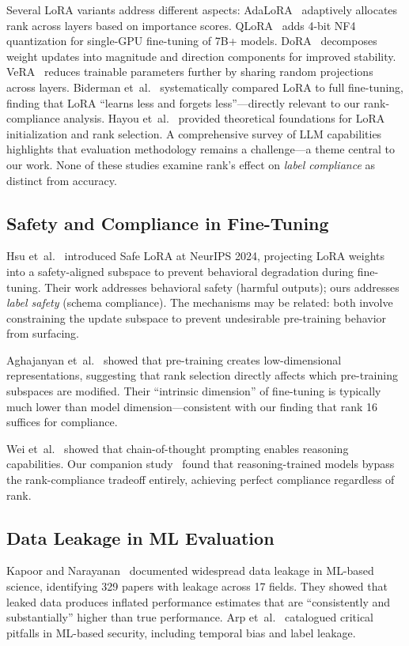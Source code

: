 \documentclass[journal]{IEEEtran}
\begin{document}
Several LoRA variants address different aspects: AdaLoRA~\cite{zhang2023} adaptively allocates rank across layers based on importance scores. QLoRA~\cite{dettmers2023} adds 4-bit NF4 quantization for single-GPU fine-tuning of 7B+ models. DoRA~\cite{liu2024} decomposes weight updates into magnitude and direction components for improved stability. VeRA~\cite{kopiczko2024} reduces trainable parameters further by sharing random projections across layers. Biderman et~al.~\cite{biderman2024} systematically compared LoRA to full fine-tuning, finding that LoRA ``learns less and forgets less''---directly relevant to our rank-compliance analysis. Hayou et~al.~\cite{hayou2024} provided theoretical foundations for LoRA initialization and rank selection. A comprehensive survey of LLM capabilities~\cite{zhao2023} highlights that evaluation methodology remains a challenge---a theme central to our work. None of these studies examine rank's effect on \emph{label compliance} as distinct from accuracy.

\subsection{Safety and Compliance in Fine-Tuning}
Hsu et~al.~\cite{safelora2024} introduced Safe LoRA at NeurIPS 2024, projecting LoRA weights into a safety-aligned subspace to prevent behavioral degradation during fine-tuning. Their work addresses behavioral safety (harmful outputs); ours addresses \emph{label safety} (schema compliance). The mechanisms may be related: both involve constraining the update subspace to prevent undesirable pre-training behavior from surfacing.

Aghajanyan et~al.~\cite{aghajanyan2021} showed that pre-training creates low-dimensional representations, suggesting that rank selection directly affects which pre-training subspaces are modified. Their ``intrinsic dimension'' of fine-tuning is typically much lower than model dimension---consistent with our finding that rank 16 suffices for compliance.

Wei et~al.~\cite{wei2022} showed that chain-of-thought prompting enables reasoning capabilities. Our companion study~\cite{p21} found that reasoning-trained models bypass the rank-compliance tradeoff entirely, achieving perfect compliance regardless of rank.

\subsection{Data Leakage in ML Evaluation}
Kapoor and Narayanan~\cite{kapoor2023} documented widespread data leakage in ML-based science, identifying 329 papers with leakage across 17 fields. They showed that leaked data produces inflated performance estimates that are ``consistently and substantially'' higher than true performance. Arp et~al.~\cite{arp2022} catalogued critical pitfalls in ML-based security, including temporal bias and label leakage.
\end{document}
